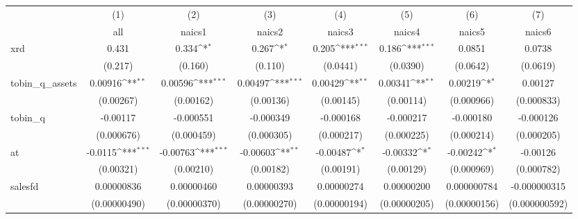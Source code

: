 {
\def\sym#1{\ifmmode^{#1}\else\(^{#1}\)\fi}
\begin{tabular}{l*{7}{c}}
\hline\hline
            &\multicolumn{1}{c}{(1)}&\multicolumn{1}{c}{(2)}&\multicolumn{1}{c}{(3)}&\multicolumn{1}{c}{(4)}&\multicolumn{1}{c}{(5)}&\multicolumn{1}{c}{(6)}&\multicolumn{1}{c}{(7)}\\
            &\multicolumn{1}{c}{all}&\multicolumn{1}{c}{naics1}&\multicolumn{1}{c}{naics2}&\multicolumn{1}{c}{naics3}&\multicolumn{1}{c}{naics4}&\multicolumn{1}{c}{naics5}&\multicolumn{1}{c}{naics6}\\
\hline
xrd         &       0.431         &       0.334\sym{*}  &       0.267\sym{*}  &       0.205\sym{***}&       0.186\sym{***}&      0.0851         &      0.0738         \\
            &     (0.217)         &     (0.160)         &     (0.110)         &    (0.0441)         &    (0.0390)         &    (0.0642)         &    (0.0619)         \\
[1em]
tobin\_q\_assets&     0.00916\sym{**} &     0.00596\sym{***}&     0.00497\sym{***}&     0.00429\sym{**} &     0.00341\sym{**} &     0.00219\sym{*}  &     0.00127         \\
            &   (0.00267)         &   (0.00162)         &   (0.00136)         &   (0.00145)         &   (0.00114)         &  (0.000966)         &  (0.000833)         \\
[1em]
tobin\_q     &    -0.00117         &   -0.000551         &   -0.000349         &   -0.000168         &   -0.000217         &   -0.000180         &   -0.000126         \\
            &  (0.000676)         &  (0.000459)         &  (0.000305)         &  (0.000217)         &  (0.000225)         &  (0.000214)         &  (0.000205)         \\
[1em]
at          &     -0.0115\sym{***}&    -0.00763\sym{***}&    -0.00603\sym{**} &    -0.00487\sym{*}  &    -0.00332\sym{*}  &    -0.00242\sym{*}  &    -0.00126         \\
            &   (0.00321)         &   (0.00210)         &   (0.00182)         &   (0.00191)         &   (0.00129)         &  (0.000969)         &  (0.000782)         \\
[1em]
salesfd     &  0.00000836         &  0.00000460         &  0.00000393         &  0.00000274         &  0.00000200         & 0.000000784         &-0.000000315         \\
            &(0.00000490)         &(0.00000370)         &(0.00000270)         &(0.00000194)         &(0.00000205)         &(0.00000156)         &(0.000000592)         \\

\end{tabular}}
